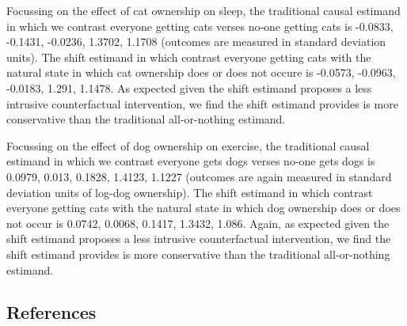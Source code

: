 \documentclass[
  singlecolumn,
  9pt]{article}
\begin{document}
Focussing on the effect of cat ownership on sleep, the traditional
causal estimand in which we contrast everyone getting cats verses no-one
getting cats is -0.0833, -0.1431, -0.0236, 1.3702, 1.1708 (outcomes are
measured in standard deviation units). The shift estimand in which
contrast everyone getting cats with the natural state in which cat
ownership does or does not occure is -0.0573, -0.0963, -0.0183, 1.291,
1.1478. As expected given the shift estimand proposes a less intrusive
counterfactual intervention, we find the shift estimand provides is more
conservative than the traditional all-or-nothing estimand.

Focussing on the effect of dog ownership on exercise, the traditional
causal estimand in which we contrast everyone gets dogs verses no-one
gets dogs is 0.0979, 0.013, 0.1828, 1.4123, 1.1227 (outcomes are again
measured in standard deviation units of log-dog ownership). The shift
estimand in which contrast everyone getting cats with the natural state
in which dog ownership does or does not occur is 0.0742, 0.0068, 0.1417,
1.3432, 1.086. Again, as expected given the shift estimand proposes a
less intrusive counterfactual intervention, we find the shift estimand
provides is more conservative than the traditional all-or-nothing
estimand.

\newpage{}

\subsection*{References}\label{references}
\end{document}
